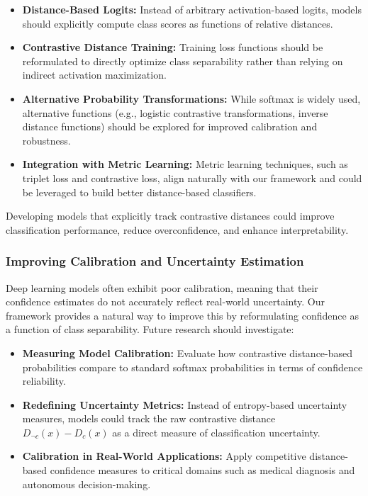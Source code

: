 \documentclass[12pt]{article}
\begin{document}
\begin{itemize}
    \item \textbf{Distance-Based Logits:} Instead of arbitrary activation-based logits, models should explicitly compute class scores as functions of relative distances.
    \item \textbf{Contrastive Distance Training:} Training loss functions should be reformulated to directly optimize class separability rather than relying on indirect activation maximization.
    \item \textbf{Alternative Probability Transformations:} While softmax is widely used, alternative functions (e.g., logistic contrastive transformations, inverse distance functions) should be explored for improved calibration and robustness.
    \item \textbf{Integration with Metric Learning:} Metric learning techniques, such as triplet loss and contrastive loss, align naturally with our framework and could be leveraged to build better distance-based classifiers.
\end{itemize}

Developing models that explicitly track contrastive distances could improve classification performance, reduce overconfidence, and enhance interpretability.

\subsubsection{Improving Calibration and Uncertainty Estimation}

Deep learning models often exhibit poor calibration, meaning that their confidence estimates do not accurately reflect real-world uncertainty. Our framework provides a natural way to improve this by reformulating confidence as a function of class separability. Future research should investigate:

\begin{itemize}
    \item \textbf{Measuring Model Calibration:} Evaluate how contrastive distance-based probabilities compare to standard softmax probabilities in terms of confidence reliability.
    \item \textbf{Redefining Uncertainty Metrics:} Instead of entropy-based uncertainty measures, models could track the raw contrastive distance \( D_{\neg c}(x) - D_c(x) \) as a direct measure of classification uncertainty.
    \item \textbf{Calibration in Real-World Applications:} Apply competitive distance-based confidence measures to critical domains such as medical diagnosis and autonomous decision-making.
\end{itemize}
\end{document}
